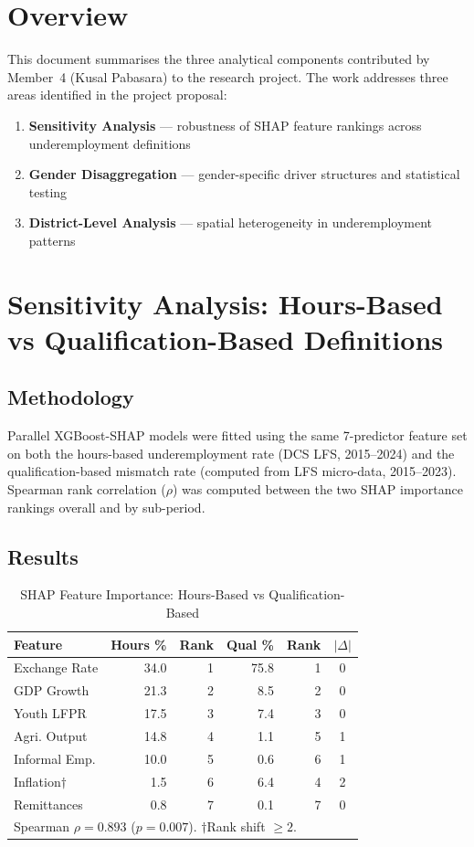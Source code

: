 \documentclass[11pt,a4paper]{article}
\begin{document}
\section{Overview}

This document summarises the three analytical components contributed by Member~4 (Kusal Pabasara) to the research project. The work addresses three areas identified in the project proposal:
\begin{enumerate}[noitemsep]
  \item \textbf{Sensitivity Analysis} --- robustness of SHAP feature rankings across underemployment definitions
  \item \textbf{Gender Disaggregation} --- gender-specific driver structures and statistical testing
  \item \textbf{District-Level Analysis} --- spatial heterogeneity in underemployment patterns
\end{enumerate}

\section{Sensitivity Analysis: Hours-Based vs Qualification-Based Definitions}

\subsection{Methodology}
Parallel XGBoost-SHAP models were fitted using the same 7-predictor feature set on both the hours-based underemployment rate (DCS LFS, 2015--2024) and the qualification-based mismatch rate (computed from LFS micro-data, 2015--2023). Spearman rank correlation ($\rho$) was computed between the two SHAP importance rankings overall and by sub-period.

\subsection{Results}

\begin{table}[ht]
\caption{SHAP Feature Importance: Hours-Based vs Qualification-Based}
\label{tab:shap_sensitivity}
\setlength{\tabcolsep}{3pt}
\footnotesize
\begin{tabular}{lrrrrc}
\toprule
\textbf{Feature} & \textbf{Hours \%} & \textbf{Rank} & \textbf{Qual \%} & \textbf{Rank} & \textbf{$|\Delta|$}\\
\midrule
Exchange Rate & 34.0 & 1 & 75.8 & 1 & 0\\
GDP Growth & 21.3 & 2 & 8.5 & 2 & 0\\
Youth LFPR & 17.5 & 3 & 7.4 & 3 & 0\\
Agri. Output & 14.8 & 4 & 1.1 & 5 & 1\\
Informal Emp. & 10.0 & 5 & 0.6 & 6 & 1\\
Inflation$\dagger$ & 1.5 & 6 & 6.4 & 4 & 2\\
Remittances & 0.8 & 7 & 0.1 & 7 & 0\\
\midrule
\multicolumn{6}{l}{\scriptsize Spearman $\rho = 0.893$ ($p = 0.007$). $\dagger$Rank shift $\geq 2$.}\\
\bottomrule
\end{tabular}
\end{table}
\end{document}
